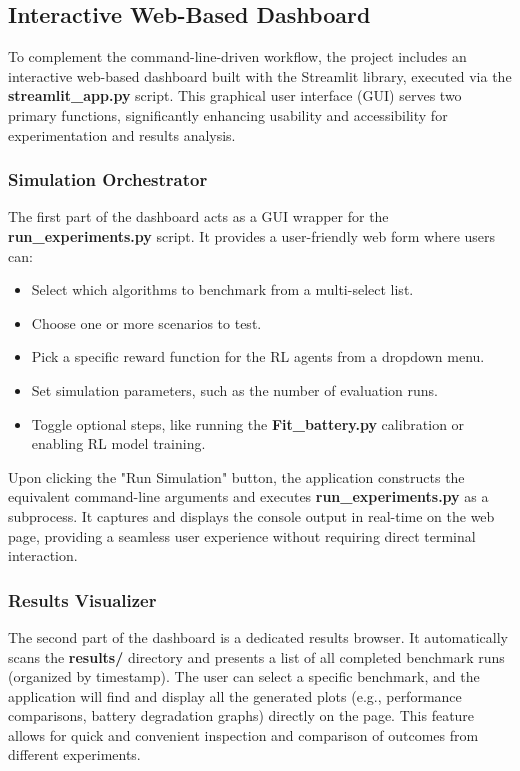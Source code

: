 \subsection{Interactive Web-Based Dashboard}
\label{sec:streamlit_app}
To complement the command-line-driven workflow, the project includes an interactive web-based dashboard built with the Streamlit library, executed via the \textbf{streamlit\_app.py} script. This graphical user interface (GUI) serves two primary functions, significantly enhancing usability and accessibility for experimentation and results analysis.

\subsubsection{Simulation Orchestrator}
The first part of the dashboard acts as a GUI wrapper for the \textbf{run\_experiments.py} script. It provides a user-friendly web form where users can:
\begin{itemize}
    \item Select which algorithms to benchmark from a multi-select list.
    \item Choose one or more scenarios to test.
    \item Pick a specific reward function for the RL agents from a dropdown menu.
    \item Set simulation parameters, such as the number of evaluation runs.
    \item Toggle optional steps, like running the \textbf{Fit\_battery.py} calibration or enabling RL model training.
\end{itemize}
Upon clicking the "Run Simulation" button, the application constructs the equivalent command-line arguments and executes \textbf{run\_experiments.py} as a subprocess. It captures and displays the console output in real-time on the web page, providing a seamless user experience without requiring direct terminal interaction.

\subsubsection{Results Visualizer}
The second part of the dashboard is a dedicated results browser. It automatically scans the \textbf{results/} directory and presents a list of all completed benchmark runs (organized by timestamp). The user can select a specific benchmark, and the application will find and display all the generated plots (e.g., performance comparisons, battery degradation graphs) directly on the page. This feature allows for quick and convenient inspection and comparison of outcomes from different experiments.

